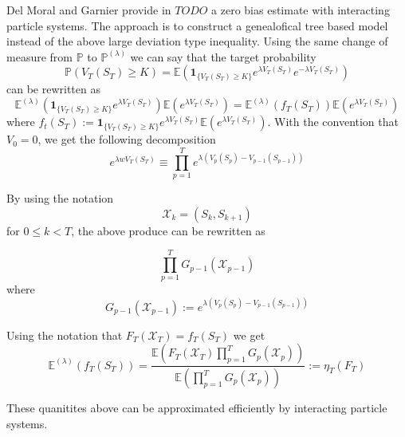 Del Moral and Garnier provide in $TODO$ a zero bias estimate with interacting particle systems. The approach is to construct a genealofical tree based model instead of the above large deviation type inequality.
Using the same change of measure from $\mathbb{P}$ to $\mathbb{P}^{(\lambda)}$ we can say that the target probability
$$\mathbb{P}(V_T(S_T) \geq K) = \mathbb{E}\left( \mathbf{1}_{\{V_T(S_T) \geq K\}}e^{\lambda V_T(S_T)}e^{-\lambda V_T(S_T)} \right)$$
can be rewritten as
$$\mathbb{E}^{(\lambda)} \left(  \mathbf{1}_{\{V_T(S_T) \geq K\}} e^{\lambda V_T(S_T)} \right) \mathbb{E} \left(e^{\lambda V_T(S_T)}\right) = 
\mathbb{E}^{(\lambda)}(f_T(S_T)) \mathbb{E}(e^{\lambda V_T(S_T)})  $$
where $f_t(S_T) := \mathbf{1}_{\{V_T(S_T) \geq K\}}e^{\lambda V_T(S_T)} \mathbb{E}\left(e^{\lambda V_T(S_T)}\right) $. With the convention that $V_0 = 0$, we get the following decomposition
$$e^{\lambda w V_T(S_T)} \equiv \prod_{p=1}^{T} e^{\lambda (V_p(S_p) - V_{p-1}(S_{p-1}))}$$

By using the notation $$\mathcal{X}_k = (S_k, S_{k+1})$$ for $0 \leq k < T$, the above produce can be rewritten as

$$\prod_{p=1}^{T} G_{p-1}(\mathcal{X}_{p-1})$$ where
$$G_{p-1}(\mathcal{X}_{p-1}) := e^{\lambda (V_p(S_p) - V_{p-1}(S_{p-1}))}$$

Using the notation that $F_T(\mathcal{X}_T) = f_T(S_T)$ we get
\begin{equation}
\mathbb{E}^{(\lambda)}(f_T(S_T)) = \frac{\mathbb{E}(F_T(\mathcal{X}_T)\prod_{p=1}^{T}G_p(\mathcal{X}_p))}{\mathbb{E}(\prod_{p=1}^{T}G_p(\mathcal{X}_p))} := \eta_T(F_T)
\end{equation}

These quanitites above can be approximated efficiently by interacting particle systems.

